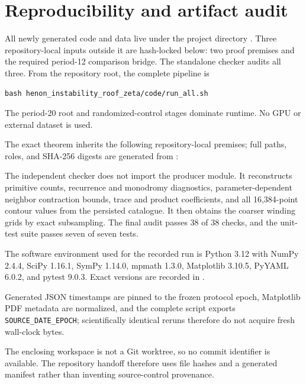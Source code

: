 \section{Reproducibility and artifact audit}
\label{app:reproducibility}

All newly generated code and data live under the project directory
.  Three repository-local inputs outside it
are hash-locked below: two proof premises and the required period-12 comparison
bridge.  The standalone checker audits all three.  From the repository root,
the complete pipeline is
\begin{verbatim}
bash henon_instability_roof_zeta/code/run_all.sh
\end{verbatim}
The period-20 root and randomized-control stages dominate runtime.  No GPU or
external dataset is used.

The exact theorem inherits the following repository-local premises; full
paths, roles, and SHA-256 digests are generated from
:




The independent checker does not import the producer module.  It reconstructs
primitive counts, recurrence and monodromy diagnostics, parameter-dependent
neighbor contraction bounds, trace and product coefficients, and all
16,384-point contour values from the persisted catalogue.  It then obtains the
coarser winding grids by exact subsampling.  The final audit passes 38 of 38
checks, and the unit-test suite passes seven of seven tests.

The software environment used for the recorded run is Python 3.12 with NumPy
2.4.4, SciPy 1.16.1, SymPy 1.14.0, mpmath 1.3.0, Matplotlib 3.10.5, PyYAML
6.0.2, and pytest 9.0.3.  Exact versions are recorded in
.

Generated JSON timestamps are pinned to the frozen protocol epoch, Matplotlib
PDF metadata are normalized, and the complete script exports
\texttt{SOURCE\_DATE\_EPOCH}; scientifically identical reruns therefore do not
acquire fresh wall-clock bytes.

The enclosing workspace is not a Git worktree, so no commit identifier is
available.  The repository handoff therefore uses file hashes and a generated
manifest rather than inventing source-control provenance.
